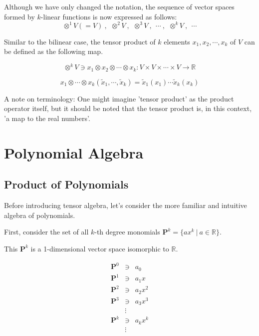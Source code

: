 \documentclass[uplatex,a4j,12pt,dvipdfmx]{jsarticle}
\begin{document}
Although we have only changed the notation, the sequence of vector spaces formed by $k$-linear functions is now expressed as follows:
$$
	\otimes^{1} V (= V) \ , \ \ \otimes^{2} V \ , \ \ \otimes^{3} V \ , \ \ \cdots \ , \ \ \otimes^{k} V \ , \ \ \cdots
$$

Similar to the bilinear case,
the tensor product of $k$ elements $x_{1}, x_{2} , \cdots , x_{k}$ of $V$ can be defined as the following map.

$$ \otimes^{k} V \ni x_{1} \otimes x_{2} \otimes \cdots \otimes x_{k}: V \times V \times \cdots \times V \to \mathbb{R}$$

$$
	x_{1} \otimes \cdots \otimes x_{k} ( \tilde{x}_{1} , \cdots, \tilde{x}_{k})
	=
	\tilde{x}_{1} (x_{1}) \cdots \tilde{x}_{k} (x_{k})
$$

A note on terminology:
One might imagine 'tensor product' as the product operator itself, but it should be noted that the tensor product is, in this context, 'a map to the real numbers'.

\section{Polynomial Algebra}

\subsection{Product of Polynomials}

Before introducing tensor algebra, let's consider the more familiar and intuitive algebra of polynomials.

First, consider the set of all $k$-th degree monomials $\mathbf{P}^{k} = \{ ax^{k} \ | \ a \in \mathbb{R} \}$.

This $\mathbf{P}^{k}$ is a 1-dimensional vector space isomorphic to $\mathbb{R}$.

\[
	\begin{array}{rcl}
		\mathbf{P}^{0} & \ni    & a_{0}       \\
		\mathbf{P}^{1} & \ni    & a_{1} x     \\
		\mathbf{P}^{2} & \ni    & a_{2} x^{2} \\
		\mathbf{P}^{3} & \ni    & a_{3} x^{3} \\
		               & \vdots &             \\
		\mathbf{P}^{k} & \ni    & a_{k} x^{k} \\
		               & \vdots &             \\
	\end{array}
\]
\end{document}
